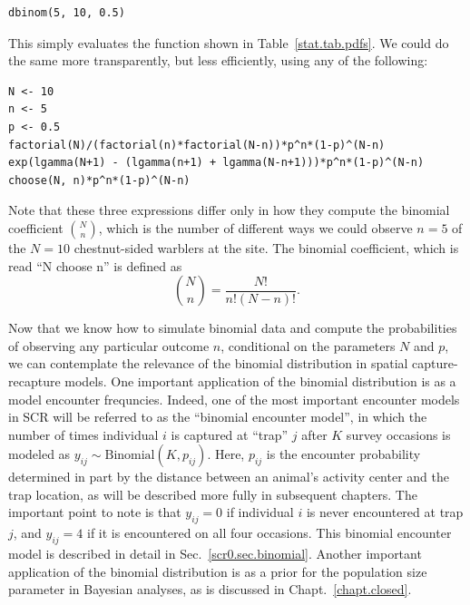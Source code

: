 \begin{verbatim}
dbinom(5, 10, 0.5)
\end{verbatim}
This simply evaluates the function shown in
Table~\ref{stat.tab.pdfs}. We could do the same more transparently, but
less efficiently, using any of the following:
\begin{verbatim}
N <- 10
n <- 5
p <- 0.5
factorial(N)/(factorial(n)*factorial(N-n))*p^n*(1-p)^(N-n)
exp(lgamma(N+1) - (lgamma(n+1) + lgamma(N-n+1)))*p^n*(1-p)^(N-n)
choose(N, n)*p^n*(1-p)^(N-n)
\end{verbatim}

Note that these three expressions differ only in how they compute the
binomial coefficient $\binom{N}{n}$, which is the number of different ways
we could observe $n=5$ of the $N=10$ chestnut-sided warblers at the site. The
binomial coefficient, which is read ``N choose n'' is defined as
\begin{equation}
  \label{eq:1}
  \binom{N}{n} = \frac{N!}{n!(N-n)!}.
\end{equation}

Now that we know how to simulate binomial data and compute the
probabilities of observing any particular outcome $n$, conditional on the
parameters $N$ and $p$, we can contemplate the relevance of the
binomial distribution in spatial capture-recapture models. One
important application of the binomial distribution is as a model encounter
frequncies. Indeed, one of the most important encounter models in SCR
will be referred to as the ``binomial encounter model'', in which
the number of times individual $i$ is captured at ``trap'' $j$ after
$K$ survey occasions is
modeled as $y_{ij} \sim \text{Binomial}(K, p_{ij})$. Here, $p_{ij}$ is the
encounter probability determined in part by the distance between an
animal's activity center and the trap location, as will be described
more fully in subsequent chapters. The important point to note is
that $y_{ij}=0$ if individual $i$ is never encountered at trap $j$,
and $y_{ij}=4$ if it is encountered on all four occasions. This
binomial encounter model is
described in detail in Sec.~\ref{scr0.sec.binomial}.
Another important application of the binomial distribution is as a
prior for the population size parameter in Bayesian analyses, as is
discussed in Chapt.~\ref{chapt.closed}.




